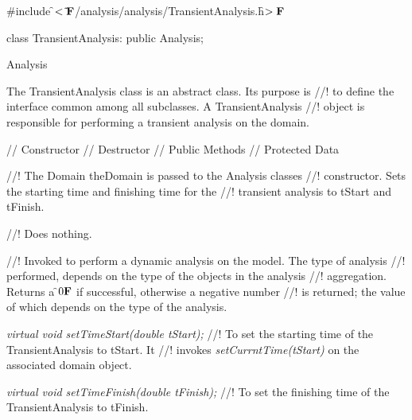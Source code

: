 
\indent \#include \f$<\tilde{ }{\bf F}$/analysis/analysis/TransientAnalysis.h\f$>{\bf F}$

\indent class TransientAnalysis: public Analysis;

\indent Analysis
\indent{}

\indent The TransientAnalysis class is an abstract class. Its purpose is
//! to define the interface common among all subclasses. A TransientAnalysis
//! object is responsible for performing a transient analysis on the domain.


\indent // Constructor
\indent // Destructor
\indent // Public Methods
\indent // Protected Data

//! The Domain \p theDomain is passed to the Analysis classes
//! constructor. Sets the starting time and finishing time for the
//! transient analysis to \p tStart and \p tFinish.

//! Does nothing.

//! Invoked to perform a dynamic analysis on the model. The type of analysis
//! performed, depends on the type of the objects in the analysis
//! aggregation. Returns a \f$0{\bf F}$ if successful, otherwise a negative number
//! is returned; the value of which depends on the type of the analysis.

{\em virtual void setTimeStart(double tStart);}
//! To set the starting time of the TransientAnalysis to \p tStart. It
//! invokes {\em setCurrntTime(tStart)} on the associated domain object.

{\em virtual void setTimeFinish(double tFinish);}
//! To set the finishing time of the TransientAnalysis to \p tFinish.

